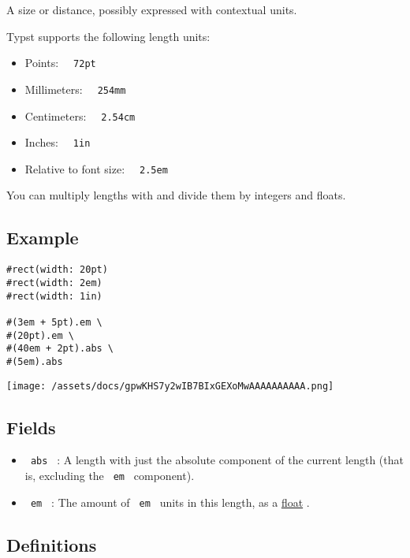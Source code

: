A size or distance, possibly expressed with contextual units.

Typst supports the following length units:

\begin{itemize}
\tightlist
\item
  Points: \texttt{\ }{\texttt{\ 72pt\ }}\texttt{\ }
\item
  Millimeters: \texttt{\ }{\texttt{\ 254mm\ }}\texttt{\ }
\item
  Centimeters: \texttt{\ }{\texttt{\ 2.54cm\ }}\texttt{\ }
\item
  Inches: \texttt{\ }{\texttt{\ 1in\ }}\texttt{\ }
\item
  Relative to font size: \texttt{\ }{\texttt{\ 2.5em\ }}\texttt{\ }
\end{itemize}

You can multiply lengths with and divide them by integers and floats.

\subsection{Example}\label{example}

\begin{verbatim}
#rect(width: 20pt)
#rect(width: 2em)
#rect(width: 1in)

#(3em + 5pt).em \
#(20pt).em \
#(40em + 2pt).abs \
#(5em).abs
\end{verbatim}

\texttt{[image: /assets/docs/gpwKHS7y2wIB7BIxGEXoMwAAAAAAAAAA.png]}

\subsection{Fields}\label{fields}

\begin{itemize}
\tightlist
\item
  \texttt{\ abs\ } : A length with just the absolute component of the
  current length (that is, excluding the \texttt{\ em\ } component).
\item
  \texttt{\ em\ } : The amount of \texttt{\ em\ } units in this length,
  as a \href{/docs/reference/foundations/float/}{float} .
\end{itemize}

\subsection{\texorpdfstring{{ Definitions
}}{ Definitions }}\label{definitions}


